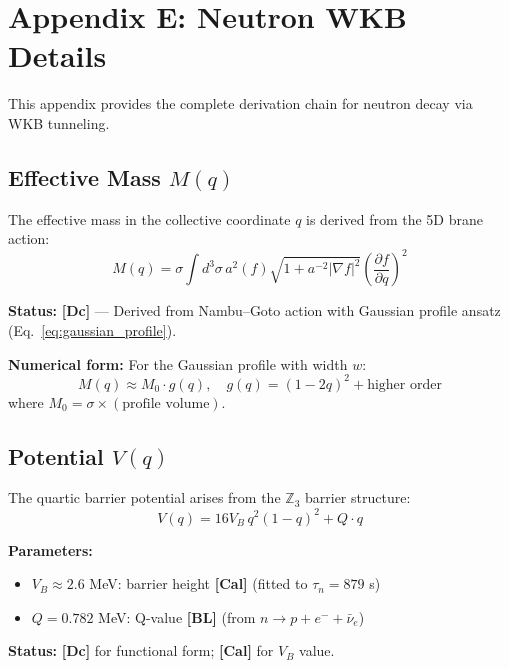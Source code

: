\documentclass[11pt,a4paper]{article}
\newcommand{\tagDc}{\textcolor{blue!70!black}{\textbf{[Dc]}}}
\newcommand{\tagCal}{\textcolor{purple!70!black}{\textbf{[Cal]}}}
\newcommand{\tagBL}{\textcolor{gray!70!black}{\textbf{[BL]}}}
\begin{document}
\section{Appendix E: Neutron WKB Details}
\label{app:wkb}

This appendix provides the complete derivation chain for neutron decay via WKB tunneling.

\subsection{Effective Mass $M(q)$}

The effective mass in the collective coordinate $q$ is derived from the 5D brane action:
\begin{equation}
    M(q) = \sigma \int d^3\sigma \, a^2(f) \sqrt{1 + a^{-2}|\nabla f|^2} \left( \frac{\partial f}{\partial q} \right)^2
\end{equation}

\textbf{Status:} \tagDc{} --- Derived from Nambu--Goto action with Gaussian profile ansatz (Eq.~\ref{eq:gaussian_profile}).

\textbf{Numerical form:} For the Gaussian profile with width $w$:
\begin{equation}
    M(q) \approx M_0 \cdot g(q), \quad g(q) = (1-2q)^2 + \text{higher order}
\end{equation}
where $M_0 = \sigma \times (\text{profile volume})$.

\subsection{Potential $V(q)$}

The quartic barrier potential arises from the $\mathbb{Z}_3$ barrier structure:
\begin{equation}
    V(q) = 16 V_B \, q^2 (1-q)^2 + Q \cdot q
\end{equation}

\textbf{Parameters:}
\begin{itemize}[nosep]
    \item $V_B \approx 2.6$ MeV: barrier height \tagCal{} (fitted to $\tau_n = 879$ s)
    \item $Q = 0.782$ MeV: Q-value \tagBL{} (from $n \to p + e^- + \bar{\nu}_e$)
\end{itemize}

\textbf{Status:} \tagDc{} for functional form; \tagCal{} for $V_B$ value.
\end{document}
